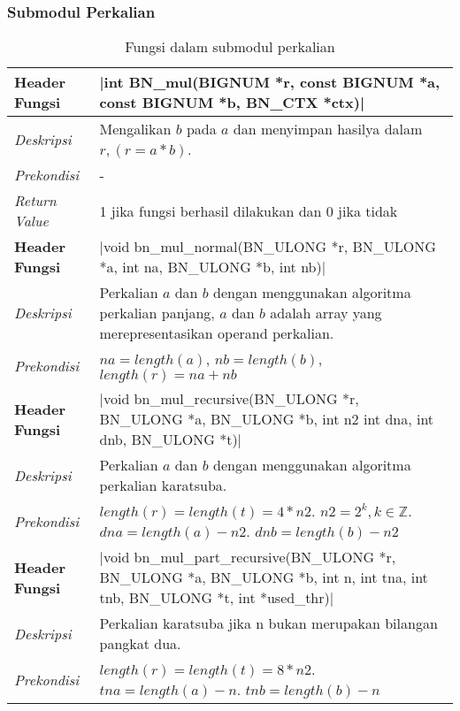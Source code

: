 
\subsubsection{Submodul Perkalian}
\begin{table}[h]
    \small
  \caption{Fungsi dalam submodul perkalian}
  \label{tab:bn_mul}
  \begin{tabular}{R{2.8cm}L{10.5cm}}

    \toprule
    \textbf{Header Fungsi} & |int BN_mul(BIGNUM *r, const BIGNUM *a, const BIGNUM *b, BN_CTX *ctx)| \\ \midrule
    \textit{Deskripsi}     & Mengalikan $b$ pada $a$ dan menyimpan hasilya dalam $r, (r = a * b)$.\\
    \textit{Prekondisi}    & -\\
    \textit{Return Value}  & 1 jika fungsi berhasil dilakukan dan 0 jika tidak
    \\ \bottomrule
    \textbf{Header Fungsi} & |void bn_mul_normal(BN_ULONG *r, BN_ULONG *a, int na, BN_ULONG *b, int nb)| \\ \midrule
    \textit{Deskripsi}     & Perkalian $a$ dan $b$ dengan menggunakan algoritma perkalian panjang, $a$ dan $b$ adalah array yang merepresentasikan operand perkalian.  \\
    \textit{Prekondisi}    & $na = length(a)$, $nb = length(b)$, $length(r) = na + nb$ \\
    \bottomrule
    \textbf{Header Fungsi} & |void bn_mul_recursive(BN_ULONG *r, BN_ULONG *a, BN_ULONG *b, int n2 int dna, int dnb, BN_ULONG *t)| \\ \midrule
    \textit{Deskripsi}     & Perkalian $a$ dan $b$ dengan menggunakan algoritma perkalian karatsuba.\\
    \textit{Prekondisi}    & $length(r) = length(t) = 4*n2$. $n2 = 2^k, k \in \mathbb{Z} $. $dna = length(a) - n2$. $dnb = length(b) - n2$ \\
    \bottomrule
    \textbf{Header Fungsi} & |void bn_mul_part_recursive(BN_ULONG *r, BN_ULONG *a, BN_ULONG *b, int n, int tna, int tnb, BN_ULONG *t, int *used_thr)| \\ \midrule
    \textit{Deskripsi}     & Perkalian karatsuba jika n bukan merupakan bilangan pangkat dua.\\
    \textit{Prekondisi}    & $length(r) = length(t) = 8*n2$. $tna = length(a) - n$. $tnb = length(b) - n$ \\
    \bottomrule
  \end{tabular}
\end{table}

